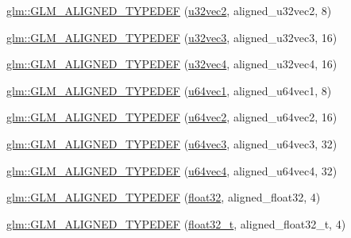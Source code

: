 \begin{DoxyCompactItemize}
\item 
\mbox{\hyperlink{group__gtx__type__aligned_ga1fa0dfc8feb0fa17dab2acd43e05342b}{glm\+::\+G\+L\+M\+\_\+\+A\+L\+I\+G\+N\+E\+D\+\_\+\+T\+Y\+P\+E\+D\+EF}} (\mbox{\hyperlink{group__gtc__type__precision_gad854a1005ce84d8f6e8f05e42893f5c9}{u32vec2}}, aligned\+\_\+u32vec2, 8)
\item 
\mbox{\hyperlink{group__gtx__type__aligned_ga0019500abbfa9c66eff61ca75eaaed94}{glm\+::\+G\+L\+M\+\_\+\+A\+L\+I\+G\+N\+E\+D\+\_\+\+T\+Y\+P\+E\+D\+EF}} (\mbox{\hyperlink{group__gtc__type__precision_ga342e504c37b635393e6747b85147151f}{u32vec3}}, aligned\+\_\+u32vec3, 16)
\item 
\mbox{\hyperlink{group__gtx__type__aligned_ga14fd29d01dae7b08a04e9facbcc18824}{glm\+::\+G\+L\+M\+\_\+\+A\+L\+I\+G\+N\+E\+D\+\_\+\+T\+Y\+P\+E\+D\+EF}} (\mbox{\hyperlink{group__gtc__type__precision_gad3f72b91c5b7efbc377625c44433824d}{u32vec4}}, aligned\+\_\+u32vec4, 16)
\item 
\mbox{\hyperlink{group__gtx__type__aligned_gab253845f534a67136f9619843cade903}{glm\+::\+G\+L\+M\+\_\+\+A\+L\+I\+G\+N\+E\+D\+\_\+\+T\+Y\+P\+E\+D\+EF}} (\mbox{\hyperlink{group__gtc__type__precision_gaf01aa7972f78cabc61558a0171d78a01}{u64vec1}}, aligned\+\_\+u64vec1, 8)
\item 
\mbox{\hyperlink{group__gtx__type__aligned_ga929427a7627940cdf3304f9c050b677d}{glm\+::\+G\+L\+M\+\_\+\+A\+L\+I\+G\+N\+E\+D\+\_\+\+T\+Y\+P\+E\+D\+EF}} (\mbox{\hyperlink{group__gtc__type__precision_ga989179a9ae798526e8bac59fb21678b7}{u64vec2}}, aligned\+\_\+u64vec2, 16)
\item 
\mbox{\hyperlink{group__gtx__type__aligned_gae373b6c04fdf9879f33d63e6949c037e}{glm\+::\+G\+L\+M\+\_\+\+A\+L\+I\+G\+N\+E\+D\+\_\+\+T\+Y\+P\+E\+D\+EF}} (\mbox{\hyperlink{group__gtc__type__precision_ga2d3e22f2413f79536d5cf3561949cd53}{u64vec3}}, aligned\+\_\+u64vec3, 32)
\item 
\mbox{\hyperlink{group__gtx__type__aligned_ga53a8a03dca2015baec4584f45b8e9cdc}{glm\+::\+G\+L\+M\+\_\+\+A\+L\+I\+G\+N\+E\+D\+\_\+\+T\+Y\+P\+E\+D\+EF}} (\mbox{\hyperlink{group__gtc__type__precision_ga70396c4f422824503c870db50b3059fd}{u64vec4}}, aligned\+\_\+u64vec4, 32)
\item 
\mbox{\hyperlink{group__gtx__type__aligned_gab3301bae94ef5bf59fbdd9a24e7d2a01}{glm\+::\+G\+L\+M\+\_\+\+A\+L\+I\+G\+N\+E\+D\+\_\+\+T\+Y\+P\+E\+D\+EF}} (\mbox{\hyperlink{group__gtc__type__precision_ga814f2f65354b6588b067cc5c67a6b340}{float32}}, aligned\+\_\+float32, 4)
\item 
\mbox{\hyperlink{group__gtx__type__aligned_gada9b0bea273d3ae0286f891533b9568f}{glm\+::\+G\+L\+M\+\_\+\+A\+L\+I\+G\+N\+E\+D\+\_\+\+T\+Y\+P\+E\+D\+EF}} (\mbox{\hyperlink{group__gtc__type__precision_ga642737ae3e7c434b366f2191e6944bf2}{float32\+\_\+t}}, aligned\+\_\+float32\+\_\+t, 4)

\end{DoxyCompactItemize}
